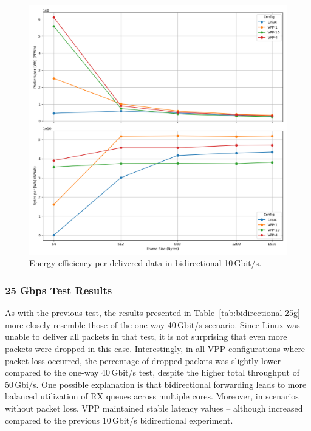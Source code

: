 \begin{figure}[!htbp]
    \centering
    \includegraphics[width=\linewidth]{images/consumption-bi-10g.png}
    \caption{Energy efficiency per delivered data in bidirectional 10\,Gbit/s.}
    \label{fig:bi-10g}
\end{figure}

\subsubsection{25 Gbps Test Results}

As with the previous test, the results presented in Table~\ref{tab:bidirectional-25g} more closely resemble those of the one-way 40\,Gbit/s scenario.  
Since Linux was unable to deliver all packets in that test, it is not surprising that even more packets were dropped in this case.  
Interestingly, in all VPP configurations where packet loss occurred, the percentage of dropped packets was slightly lower compared to the one-way 40\,Gbit/s test, 
despite the higher total throughput of 50\,Gbi/s.  
One possible explanation is that bidirectional forwarding leads to more balanced utilization of RX queues across multiple cores.  
Moreover, in scenarios without packet loss, VPP maintained stable latency values -- although increased compared to the previous 10\,Gbit/s bidirectional experiment.

